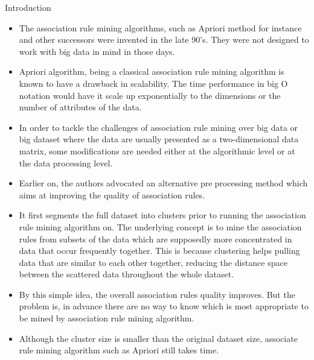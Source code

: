 \documentclass{beamer}
\begin{document}
\begin{frame}{Introduction}
    \begin{itemize}
        \item The association rule mining algorithms, such as Apriori 
method for instance and other successors were invented 
in the late 90’s. They were not designed to work with big 
data in mind in those days.
\item Apriori algorithm, being a classical association rule mining 
algorithm is known to have a drawback in scalability. The 
time performance in big O notation would have it scale up 
exponentially to the dimensions or the number of attributes 
of the data.
\item In order to tackle the challenges of association rule 
mining over big data or big dataset where the data are 
usually presented as a two-dimensional data matrix, some 
modifications are needed either at the algorithmic level or at 
the data processing level.
    \end{itemize}
\end{frame}
\begin{frame}{}
    \begin{itemize}
 \item Earlier on, the authors advocated an alternative preprocessing method which aims at improving the quality 
of association rules. 
\item It first segments the full dataset into 
clusters prior to running the association rule mining 
algorithm on. The underlying concept is to mine the 
association rules from subsets of the data which are 
supposedly more concentrated in data that occur frequently 
together. This is because clustering helps pulling data that 
are similar to each other together, reducing the distance 
space between the scattered data throughout the whole 
dataset.
\item By this simple idea, the overall association rules 
quality improves. But the problem is, in advance there are 
no way to know which is most appropriate to be mined by 
association rule mining algorithm. 
\item Although the cluster size 
is smaller than the original dataset size, associate rule 
mining algorithm such as Apriori still takes time. 
    \end{itemize}
\end{frame}
\end{document}
